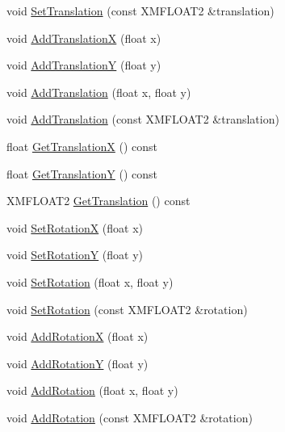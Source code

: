\begin{DoxyCompactItemize}
\item 
void \hyperlink{structmage_1_1_sprite_transform_a65a6ccde86d9697dd9568e49f709570a}{Set\+Translation} (const X\+M\+F\+L\+O\+A\+T2 \&translation)
\item 
void \hyperlink{structmage_1_1_sprite_transform_a19726f8905e837126c0d566c7e68ea3c}{Add\+TranslationX} (float x)
\item 
void \hyperlink{structmage_1_1_sprite_transform_ad3d94aefc790ec25ba67563fbc8b8dab}{Add\+TranslationY} (float y)
\item 
void \hyperlink{structmage_1_1_sprite_transform_a093c1586c22ee8a12d91d897978bc03f}{Add\+Translation} (float x, float y)
\item 
void \hyperlink{structmage_1_1_sprite_transform_a19f756cd4e9d52621c420fe32be20bba}{Add\+Translation} (const X\+M\+F\+L\+O\+A\+T2 \&translation)
\item 
float \hyperlink{structmage_1_1_sprite_transform_ab33e1ff3c03940072538fe4a6b746f10}{Get\+TranslationX} () const
\item 
float \hyperlink{structmage_1_1_sprite_transform_a7cf25b0261f0fd65339a9c3e119e2573}{Get\+TranslationY} () const
\item 
X\+M\+F\+L\+O\+A\+T2 \hyperlink{structmage_1_1_sprite_transform_a93170905081d8a7a225d251eda8c6837}{Get\+Translation} () const
\item 
void \hyperlink{structmage_1_1_sprite_transform_a0a1818532a11a000d3860542d0e1fabd}{Set\+RotationX} (float x)
\item 
void \hyperlink{structmage_1_1_sprite_transform_a228263977bd7e96d9c5c6496aaf6116d}{Set\+RotationY} (float y)
\item 
void \hyperlink{structmage_1_1_sprite_transform_a29357164a21d0fc4a6a201475ada1a28}{Set\+Rotation} (float x, float y)
\item 
void \hyperlink{structmage_1_1_sprite_transform_a4d9ab0fc5464a61cc7341f87ada51674}{Set\+Rotation} (const X\+M\+F\+L\+O\+A\+T2 \&rotation)
\item 
void \hyperlink{structmage_1_1_sprite_transform_ae03fd1cfaca1a48d7b98c0213cf6a0a1}{Add\+RotationX} (float x)
\item 
void \hyperlink{structmage_1_1_sprite_transform_a2b5b1142bb208f7a401d62fee54cab57}{Add\+RotationY} (float y)
\item 
void \hyperlink{structmage_1_1_sprite_transform_a775620fedb095a295b763b5813ef38ce}{Add\+Rotation} (float x, float y)
\item 
void \hyperlink{structmage_1_1_sprite_transform_ad817d1b07afba5966d7dc71f54d42e4e}{Add\+Rotation} (const X\+M\+F\+L\+O\+A\+T2 \&rotation)

\end{DoxyCompactItemize}

